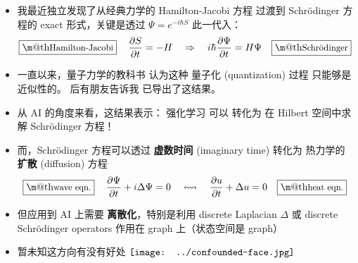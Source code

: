 \documentclass[15pt]{beamer}
\makeatletter
\newcommand{\cc}[2]{#1}
\newcommand{\cc}[2]{#2}
\newcommand{\emp}[1]{{\color{violet}#1}}
\newcommand{\red}[1]{{\color{red}#1}}
\newcommand*\confoundFace{$\vcenter{\hbox{\texttt{[image: ../confounded-face.jpg]}}}$}
\renewcommand{\boxed}[1]{\fbox{\m@th$\displaystyle\scalebox{0.9}{#1}$} \,}
\makeatother
\begin{document}
\begin{frame}[plain]
\begin{itemize}
	\item \cc{
	我最近独立发现了从经典力学的 Hamilton-Jacobi 方程 过渡到 Schr\"{o}dinger 方程的 exact 形式，关键是透过 $\Psi = e^{-i \hbar S}$ 此一代入：}{
	Recently I independently discovered an exact way to go from the classical Hamilton-Jacobi equation to the Schr\"{o}dinger equation via the substitution $\Psi = e^{-i \hbar S}$:
	}
		\begin{equation}
		\boxed{\mbox{Hamilton-Jacobi}} \quad \frac{\partial S}{\partial t} = - H \quad
		\Rightarrow
		\quad i \hbar \frac{\partial \Psi}{\partial t} = H \Psi \quad \boxed{\mbox{Schr\"{o}dinger}}
		\end{equation} 
		
	\item \cc{
	一直以来，量子力学的教科书 认为这种 量子化 (quantization) 过程 只能够是近似性的。  后有朋友告诉我 \parencite{Field2010} 已导出了这结果。}{
	We have always been told in textbooks that such a process of \emp{quantization} can only be achieved heuristically, but some friend informed me that \parencite{Field2010} has derived this result.
	}
	
	\item \cc{
	从 AI 的角度来看，这结果表示： \red{强化学习 可以 转化为 在 Hilbert 空间中求解 Schr\"{o}dinger 方程！}}{
	From the perpective of AI, this means that \red{solving the reinforcement learning problem is equivalent to solving the Schr\"{o}dinger equation} in Hilbert space!
	}
	
	\item \cc{
	而，Schr\"{o}dinger 方程可以透过 \textbf{虚数时间} (imaginary time) 转化为 热力学的 \textbf{扩散} (diffusion) 方程}{
	Moreover, the Schr\"{o}dinger equation can be transformed into the \emp{diffusion} / heat equation via the introduction of \emp{imaginary time}:
	}
		\begin{equation}
			\boxed{\mbox{wave eqn.}} \quad \frac{\partial \Psi}{\partial t} + i \Delta \Psi = 0
			\quad \leftrightsquigarrow \quad
			\frac{\partial u}{\partial t} + \Delta u = 0 \quad \boxed{\mbox{heat eqn.}}
		\end{equation}

	\item \cc{
	但应用到 AI 上需要 \textbf{离散化}，特别是利用 discrete Laplacian $\Delta$ 或 discrete Schr\"{o}dinger operators 作用在 \red{graph} 上（状态空间是 graph）}{
	Yet, if this is to be applicable to AGI, we need to \emp{discretize} the state space (which becomes a graph), and use the discrete Laplacian $\Delta$ or discrete Schr\"{o}dinger operators to act on graphs
	}
	
	\item \cc{
	暂未知这方向有没有好处 \confoundFace}{
	At this point I'm still unsure if this direction is fruitful or not \confoundFace
	}
	
\end{itemize}
\end{frame}
\end{document}
